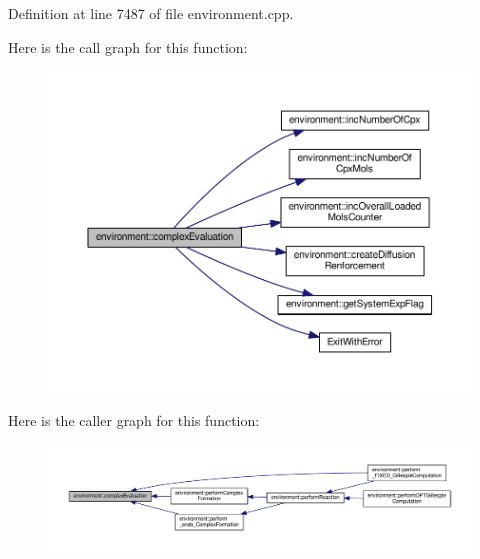 Definition at line 7487 of file environment.\-cpp.



Here is the call graph for this function\-:\nopagebreak
\begin{figure}[H]
\begin{center}
\leavevmode
\includegraphics[width=350pt]{a00003_a5ee6b203f077de1467aa72042814db7d_cgraph}
\end{center}
\end{figure}




Here is the caller graph for this function\-:\nopagebreak
\begin{figure}[H]
\begin{center}
\leavevmode
\includegraphics[width=350pt]{a00003_a5ee6b203f077de1467aa72042814db7d_icgraph}
\end{center}
\end{figure}


